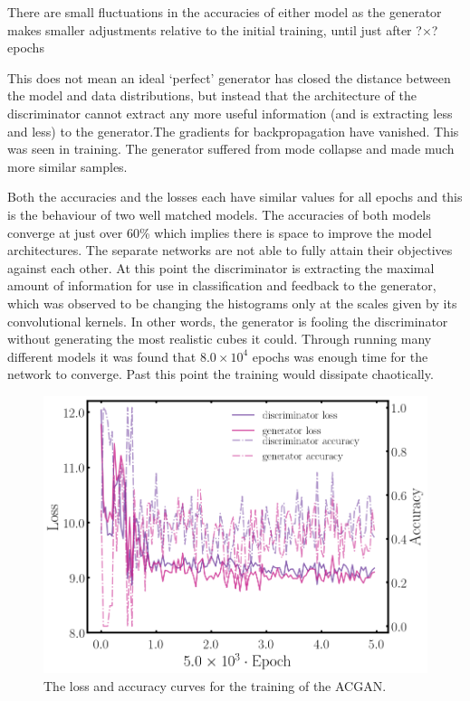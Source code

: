 \documentclass[twocolumn]{article}
\numberwithin{equation}{section}
\begin{document}
There are small fluctuations in the accuracies of either model as the generator makes smaller adjustments 
relative to the initial training, until just after ?$\times $? epochs

This does not mean an ideal `perfect' generator has closed the distance between the model and data distributions, but 
instead that the architecture of the discriminator cannot extract any more useful information (and is extracting less and
less) to the generator.The gradients for backpropagation have vanished. This was seen in training. The generator suffered
from mode collapse and made much more similar samples.

Both the accuracies and the losses each have similar values for all epochs and this is the behaviour of two well matched 
models. The accuracies of both models converge at just over 60\% which implies there is space to improve the model 
architectures. The separate networks are not able to fully attain their objectives against each other. At this point the discriminator is extracting the maximal amount of information for use in classification and feedback to the generator, 
which was observed to be changing the histograms only at the scales given by its convolutional kernels. In other words, 
the generator is fooling the discriminator without generating the most realistic cubes it could. Through running many 
different models it was found that $8.0\times 10^4$ epochs was enough time for the network to converge. Past this point 
the training would dissipate chaotically.

\begin{figure}[!ht]%
\includegraphics[width=\columnwidth]{figures/graphs/metrics.png}
\centering
\caption{The loss and accuracy curves for the training of the ACGAN.}
\label{fig:2dgan_losscurve}
\end{figure}
\end{document}
